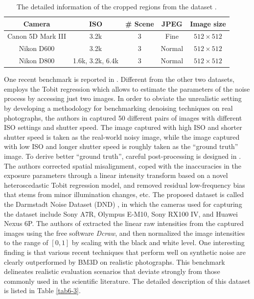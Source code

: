 \begin{table}[t!]
\caption{The detailed information of the cropped regions from the dataset \cite{crosschannel2016}.}
\label{tab6-2}
\begin{center}
\small
\renewcommand\arraystretch{1.2}
\begin{tabular*}{1\textwidth}{@{\extracolsep{\fill}}ccccc}
\hline
Camera
& 
ISO
&
\# Scene
&
JPEG
&
Image size
\\
\hline
Canon 5D Mark III & 3.2k  & 3  & Fine & $512\times512$
\\
\hline
Nikon D600 & 3.2k & 3  & Normal & $512\times512$
\\
\hline   
Nikon D800 & 1.6k, 3.2k, 6.4k & 3  & Normal & $512\times512$
\\
\hline
\end{tabular*}
\end{center}
\vspace{-4mm}
\end{table}

One recent benchmark is reported in \cite{dnd2017}. Different from the other two datasets, \cite{dnd2017} employs the Tobit regression which allows to estimate the parameters of the noise process by accessing just two images. In order to obviate the unrealistic setting by developing a methodology for benchmarking denoising techniques on real photographs, the authors in \cite{dnd2017} captured 50 different pairs of images with different ISO settings and shutter speed. The image captured with high ISO and shorter shutter speed is taken as the real-world noisy image, while the image captured with low ISO and longer shutter speed is roughly taken as the ``ground truth'' image. To derive better ``ground truth'', careful post-processing is designed in \cite{dnd2017}. The authors corrected spatial misalignment, coped with the inaccuracies in the exposure parameters through a linear intensity transform based on a novel heteroscedastic Tobit regression model, and removed residual low-frequency bias that stems from minor illumination changes, etc. The proposed dataset is called the Darmstadt Noise Dataset (DND) \cite{dnd2017}, in which the cameras used for capturing the dataset include Sony A7R, Olympus E-M10, Sony RX100 IV, and Huawei Nexus 6P. The authors of \cite{dnd2017} extracted the linear raw intensities from the captured images using the free software \textsl{Dcraw}, and then normalized the image intensities to the range of $[0, 1]$ by scaling with the black and white level. One interesting finding is that various recent techniques that perform well on synthetic noise are clearly outperformed by BM3D \cite{bm3d} on realistic photographs. This benchmark delineates realistic evaluation scenarios that deviate strongly from those commonly used in the scientific literature. The detailed description of this dataset is listed in Table \ref{tab6-3}.

